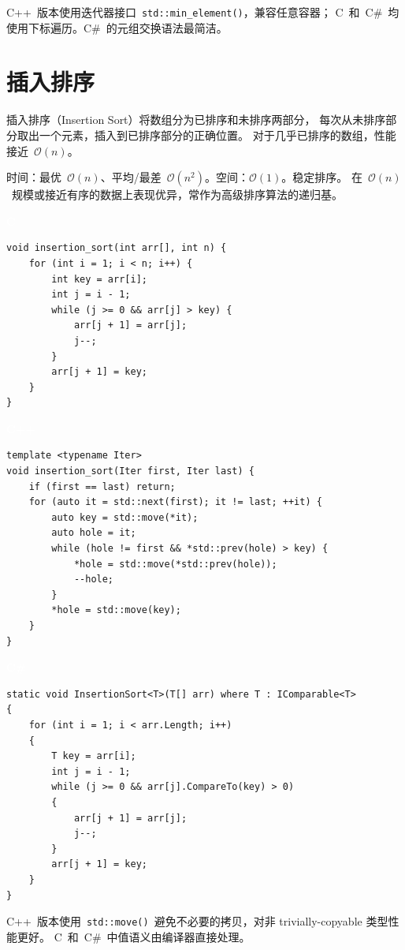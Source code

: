 \documentclass[12pt,a4paper,fontset=fandol]{ctexbook}
\newcommand{\clabel}{%
  \noindent\begin{tcolorbox}[sharp corners,colback=cheadbg,colframe=cheadbg,
    left=6pt,right=6pt,top=2pt,bottom=2pt,boxrule=0pt]
  \textcolor{white}{\small\bfseries\sffamily C}\end{tcolorbox}%
}
\newcommand{\cpplabel}{%
  \noindent\begin{tcolorbox}[sharp corners,colback=cppheadbg,colframe=cppheadbg,
    left=6pt,right=6pt,top=2pt,bottom=2pt,boxrule=0pt]
  \textcolor{white}{\small\bfseries\sffamily C++}\end{tcolorbox}%
}
\newcommand{\csharplabel}{%
  \noindent\begin{tcolorbox}[sharp corners,colback=csharpheadbg,colframe=csharpheadbg,
    left=6pt,right=6pt,top=2pt,bottom=2pt,boxrule=0pt]
  \textcolor{white}{\small\bfseries\sffamily C\#}\end{tcolorbox}%
}
\newcommand{\bigO}[1]{\mathcal{O}(#1)}
\newcommand{\Fn}[1]{\texttt{#1()}}
\begin{document}
\begin{compare}
C++~版本使用迭代器接口~\Fn{std::min\_element}，兼容任意容器；
C~和~C\#~均使用下标遍历。C\#~的元组交换语法最简洁。
\end{compare}

\chapter{插入排序}

插入排序（Insertion Sort）将数组分为已排序和未排序两部分，
每次从未排序部分取出一个元素，插入到已排序部分的正确位置。
对于几乎已排序的数组，性能接近~$\bigO{n}$。

\begin{complexitybox}
  时间：最优~$\bigO{n}$、平均/最差~$\bigO{n^2}$。空间：$\bigO{1}$。稳定排序。
  在~$\bigO{n}$~规模或接近有序的数据上表现优异，常作为高级排序算法的递归基。
\end{complexitybox}

\clabel
\begin{lstlisting}[style=cstyle]
void insertion_sort(int arr[], int n) {
    for (int i = 1; i < n; i++) {
        int key = arr[i];
        int j = i - 1;
        while (j >= 0 && arr[j] > key) {
            arr[j + 1] = arr[j];
            j--;
        }
        arr[j + 1] = key;
    }
}
\end{lstlisting}

\cpplabel
\begin{lstlisting}[style=cppstyle]
template <typename Iter>
void insertion_sort(Iter first, Iter last) {
    if (first == last) return;
    for (auto it = std::next(first); it != last; ++it) {
        auto key = std::move(*it);
        auto hole = it;
        while (hole != first && *std::prev(hole) > key) {
            *hole = std::move(*std::prev(hole));
            --hole;
        }
        *hole = std::move(key);
    }
}
\end{lstlisting}

\csharplabel
\begin{lstlisting}[style=csharpstyle]
static void InsertionSort<T>(T[] arr) where T : IComparable<T>
{
    for (int i = 1; i < arr.Length; i++)
    {
        T key = arr[i];
        int j = i - 1;
        while (j >= 0 && arr[j].CompareTo(key) > 0)
        {
            arr[j + 1] = arr[j];
            j--;
        }
        arr[j + 1] = key;
    }
}
\end{lstlisting}

\begin{compare}
C++~版本使用~\Fn{std::move}~避免不必要的拷贝，对非 trivially-copyable 类型性能更好。
C~和~C\#~中值语义由编译器直接处理。
\end{compare}
\end{document}
